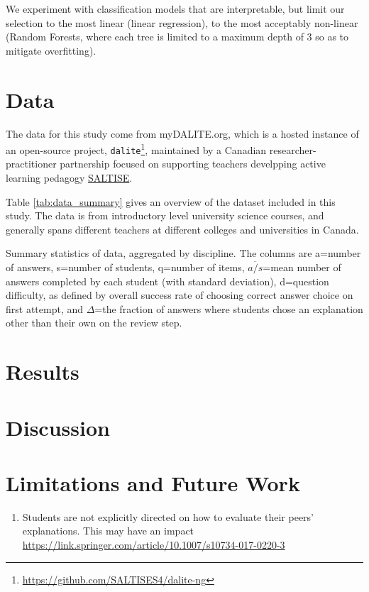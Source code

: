 \documentclass[sigconf]{acmart}
\begin{document}
We experiment with classification models that are interpretable, but limit our 
selection to the most linear (linear regression), to the most acceptably 
non-linear (Random Forests, where each tree is limited to a maximum depth of 3 
so as to mitigate overfitting).


\section{Data}

The data for this study come from myDALITE.org, which is a hosted instance of 
an open-source project, 
\verb|dalite|\footnote{\url{https://github.com/SALTISES4/dalite-ng}}, 
maintained by a Canadian researcher-practitioner partnership focused on 
supporting teachers develpping active learning pedagogy 
\href{saltise.ca}{SALTISE}.

Table \ref{tab:data_summary} gives an overview of the dataset included in this 
study.
The data is from introductory level university science courses, and generally 
spans different teachers at different colleges and universities in Canada. 
 
\begin{table}
	
	\caption{
		Summary statistics of data, aggregated by discipline. 
		The columns are a=number of answers, s=number of students, q=number of 
		items, $\overline{a/s}$=mean number of answers completed by each 
		student (with standard deviation), d=question difficulty, as defined by 
		overall success rate of choosing correct answer choice on first 
		attempt, and $\Delta$=the fraction of answers where students chose an 
		explanation other than their own on the review step. 
	}
	\label{tab:data_summary}
\end{table}

\section{Results}


\section{Discussion}

\section{Limitations and Future Work}
\begin{enumerate}
	\item Students are not explicitly directed on how to evaluate their peers' 
	explanations. This may have an impact 
	 \url{https://link.springer.com/article/10.1007/s10734-017-0220-3}
\end{enumerate}
\end{document}
